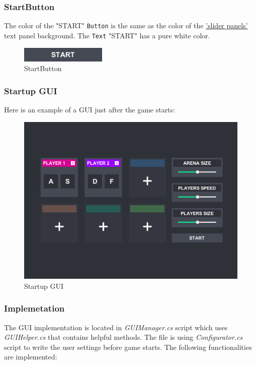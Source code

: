 \subsubsection*{StartButton}\label{gui-startbutton}
\noindent The color of the "START" \verb+Button+ is the same as the color of the \hyperref[gui-arenasizepanel]{'slider panels'} text panel background. The \verb+Text+ "START" has a pure white color.

\begin{figure}[h!]
	\centering
	\includegraphics[scale=1, frame]{gui-imgs/startbutton}
	\caption{StartButton}
\end{figure}

\subsubsection*{Startup GUI}
\noindent Here is an example of a GUI just after the game starts:

\begin{figure}[h] 
	\centering
	\includegraphics[width=\textwidth, frame]{gui-imgs/startupgui}
	\caption{Startup GUI}
\end{figure}


\subsubsection{Implemetation}\label{gui-implementation}
\indent The GUI implementation is located in \textit{GUIManager.cs} script which uses \textit{GUIHelper.cs} that contains helpful methods. The file is using \textit{Configurator.cs} script to write the user settings before game starts. The following functionalities are implemented:

